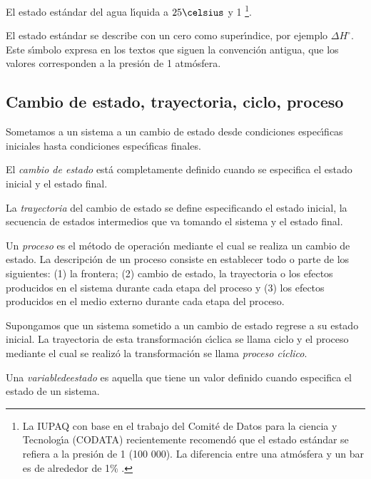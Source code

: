 \begin{example}El estado est\'andar del agua l\'{\i}quida a $25\celsius$ y 1 \bbar \footnote{ La IUPAQ con base en el trabajo del Comit\'e de Datos para la ciencia y Tecnolog\'{\i}a (CODATA) recientemente recomend\'o que el estado est\'andar se refiera a la presi\'on de 1 \bbar (100 000\pascal). La diferencia entre una atm\'osfera y un bar es de alrededor de 1\% .}.
\end{example}

 El estado est\'andar se describe con un cero como super\'{\i}ndice, por ejemplo $\Delta H^\circ$. Este s\'{\i}mbolo expresa en los textos que siguen la convenci\'on antigua, que los valores corresponden a  la presi\'on de 1 atm\'osfera.

\subsection{Cambio de estado, trayectoria, ciclo, proceso}

Sometamos a un sistema a un cambio de estado  desde
condiciones espec\'{\i}ficas iniciales hasta condiciones espec\'{\i}ficas finales.

El \textit{cambio de estado} est\'a completamente  definido cuando se especifica el estado inicial y el estado final.

La \textit{trayectoria}  del cambio de estado se define especificando el estado inicial, la secuencia de estados intermedios que va tomando el sistema y el estado final.

Un \textit{proceso}  es el m\'etodo de operaci\'on mediante el cual se realiza un cambio de estado. La descripci\'on de un proceso consiste en establecer todo o parte de los siguientes: (1) la frontera; (2) cambio de estado, la trayectoria o los efectos producidos en el sistema durante cada etapa del proceso y (3) los efectos producidos en el medio externo durante cada etapa del proceso.

Supongamos que un sistema sometido a un cambio de estado regrese a su estado inicial. La trayectoria de esta transformaci\'on c\'{\i}clica se llama ciclo y el proceso mediante el cual se realiz\'o la transformaci\'on se llama \textit{proceso c\'{\i}clico}.

Una \textit{\gls{variabledeestado}}  es aquella que tiene un
valor definido cuando especifica el estado de un sistema.

